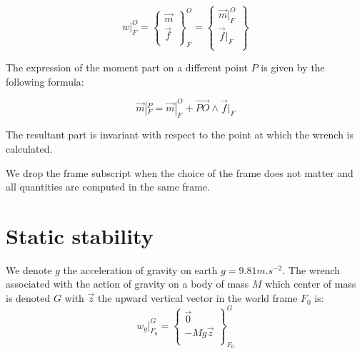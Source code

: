 \begin{equation}
  w|_F^O = \left\{ \begin{array}{r}
    \vec{m}\\
    \vec{f}\\
  \end{array} \right\}^O_F
  = \left\{ \begin{array}{r}
    \vec{m}|_F^O\\
    \vec{f}|_F\\
  \end{array}\right\}
\end{equation}

The expression of the moment part on a different point $P$ is given by the following formula:

\begin{equation}
  \vec{m}|_F^P = \vec{m}|_F^O + \overrightarrow{PO} \wedge \vec{f}|_F
\end{equation}

The resultant part is invariant with respect to the point at which the wrench is calculated.

We drop the frame subscript when the choice of the frame does not matter and all quantities are computed in the same frame.



\section{Static stability}
\label{sec:static_stability}


We denote $g$ the acceleration of gravity on earth $g = 9.81 m.s^{-2}$.
The wrench associated with the action of gravity on a body of mass $M$ which center of mass is denoted $G$ with $\vec{z}$ the upward vertical vector in the world frame $F_0$ is:
\begin{equation}
  w_g|^G_{F_0} = \left\{ \begin{array}{r}
     \vec{0} \\
     -Mg\vec{z} \\
 \end{array}\right\}^G_{F_0}
\end{equation}

